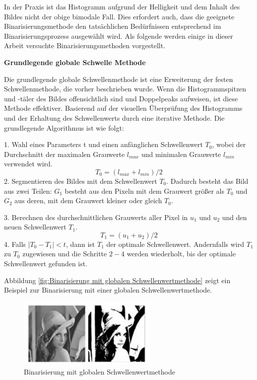 In der Praxis ist das Histogramm aufgrund der Helligkeit und dem Inhalt des Bildes nicht der obige bimodale Fall. Dies erfordert auch, dass die geeignete Binarisierungsmethode den tatsächlichen Bedürfnissen entsprechend im Binarisierungsprozess ausgewählt wird. Als folgende werden einige in dieser Arbeit versuchte Binarisierungsmethoden vorgestellt.

\textbf{Grundlegende globale Schwelle Methode}

Die grundlegende globale Schwellenmethode ist eine Erweiterung der festen Schwellenmethode, die vorher beschrieben wurde. Wenn die Histogrammspitzen und -täler des Bildes offensichtlich sind und Doppelpeaks aufweisen, ist diese Methode effektiver. Basierend auf der visuellen Überprüfung des Histogramms und der Erhaltung des Schwellenwerts durch eine iterative Methode. Die grundlegende Algorithmus ist wie folgt:

1. Wahl eines Parameters t und einen anfänglichen Schwellenwert $ T_{0} $, wobei der Durchschnitt der maximalen Grauwerte $ l_{max} $ und minimalen Grauwerte  $ l_{min} $ verwendet wird. 
\begin{equation}
 T_{0} = (l_{max}+l_{min})/2 
\end{equation}
2. Segmentieren des Bildes mit dem Schwellenwert $ T_{0} $. Dadurch besteht das Bild aus zwei Teilen: $ G_{1} $ besteht aus den Pixeln mit dem Grauwert größer als $ T_{0} $ und $ G_{2} $ aus deren, mit dem Grauwert kleiner oder gleich $ T_{0} $.

3. Berechnen des durchschnittlichen Grauwerts aller Pixel in $ u_{1} $ und $ u_{2} $ und den neuen Schwellenwert $ T_{1} $.
\begin{equation}
 T_{1} = (u_{1}+u_{2})/2
\end{equation}
4. Falls $ |T_{0} - T_{1}| < t $, dann ist $ T_{1} $ der optimale Schwellenwert. Andernfalls wird $ T_{1} $ zu $ T_{0} $ zugewiesen und die Schritte $ 2-4 $ werden wiederholt, bis der optimale Schwellenwert gefunden ist.

Abbildung \ref{fig:Binarisierung mit globalen Schwellenwertmethode} zeigt ein Beispiel zur Binarisierung mit einer globalen Schwellenwertmethode.

\begin{figure}[H]
 \centering 
  \includegraphics[keepaspectratio,width=0.6\textwidth]{images/4_ZweiteErfahrung/Binar/global.pdf}
 \caption{Binarisierung mit globalen Schwellenwertmethode}
 \label{fig:Binarisierung mit globaler Schwellenwertmethode}
\end{figure} 

